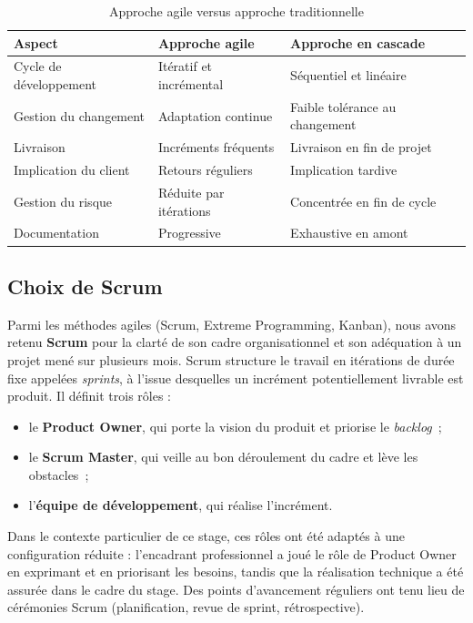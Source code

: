 \documentclass[12pt,a4paper,oneside]{report}
\begin{document}
\begin{table}[H]
\centering
\caption{Approche agile versus approche traditionnelle}
\label{tab:agile-vs-cascade}
\small
\begin{tabularx}{\linewidth}{lXX}
\toprule
\textbf{Aspect} & \textbf{Approche agile} & \textbf{Approche en cascade} \\
\midrule
Cycle de développement & Itératif et incrémental & Séquentiel et linéaire \\
Gestion du changement & Adaptation continue & Faible tolérance au changement \\
Livraison & Incréments fréquents & Livraison en fin de projet \\
Implication du client & Retours réguliers & Implication tardive \\
Gestion du risque & Réduite par itérations & Concentrée en fin de cycle \\
Documentation & Progressive & Exhaustive en amont \\
\bottomrule
\end{tabularx}
\end{table}

\subsection{Choix de Scrum}
Parmi les méthodes agiles (Scrum, Extreme Programming, Kanban), nous avons
retenu \textbf{Scrum} pour la clarté de son cadre organisationnel et son
adéquation à un projet mené sur plusieurs mois. Scrum structure le travail
en itérations de durée fixe appelées \emph{sprints}, à l'issue desquelles
un incrément potentiellement livrable est produit. Il définit trois rôles :

\begin{itemize}[leftmargin=1.4cm]
  \item le \textbf{Product Owner}, qui porte la vision du produit et
  priorise le \emph{backlog}~;
  \item le \textbf{Scrum Master}, qui veille au bon déroulement du cadre et
  lève les obstacles~;
  \item l'\textbf{équipe de développement}, qui réalise l'incrément.
\end{itemize}

Dans le contexte particulier de ce stage, ces rôles ont été adaptés à une
configuration réduite : l'encadrant professionnel a joué le rôle de Product
Owner en exprimant et en priorisant les besoins, tandis que la réalisation
technique a été assurée dans le cadre du stage. Des points d'avancement
réguliers ont tenu lieu de cérémonies Scrum (planification, revue de
sprint, rétrospective).
\end{document}
